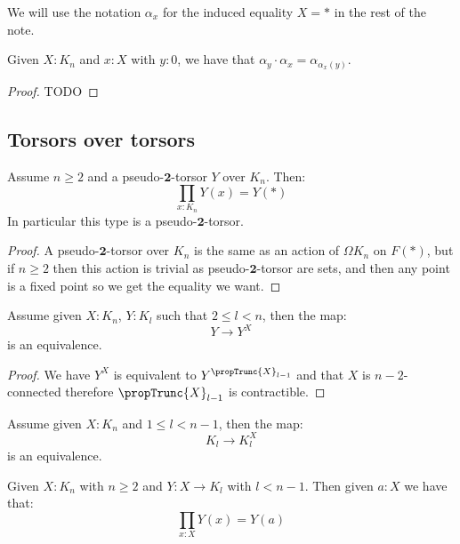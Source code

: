 We will use the notation $\alpha_x$ for the induced equality $X=*$ in the rest of the note.

\begin{lemma}\label{naturality-alpha}
Given $X:K_n$ and $x:X$ with $y:0$, we have that $\alpha_y\cdot\alpha_x = \alpha_{\alpha_x(y)}$.
\end{lemma}

\begin{proof}
TODO
\end{proof}



\subsection{Torsors over torsors}

\begin{lemma}\label{2-torsor-over-Kn}
Assume $n\geq 2$ and a pseudo-$\mathbf{2}$-torsor $Y$ over $K_n$. Then:
\[\prod_{x:K_n} Y(x) = Y(*)\]
In particular this type is a pseudo-$\mathbf{2}$-torsor.
\end{lemma}

\begin{proof}
A pseudo-$\mathbf{2}$-torsor over $K_n$ is the same as an action of $\Omega K_n$ on $F(*)$, but if $n\geq 2$ then this action is trivial as pseudo-$\mathbf{2}$-torsor are sets, and then any point is a fixed point so we get the equality we want.
\end{proof}

\begin{lemma}\label{torsor-map}
Assume given $X:K_n$, $Y:K_l$ such that $2\leq l<n$, then the map:
\[Y\to Y^X\]
is an equivalence.
\end{lemma}

\begin{proof}
We have $Y^X$ is equivalent to $Y^{\propTrunc{X}_{l-1}}$ and that $X$ is $n-2$-connected therefore $\propTrunc{X}_{l-1}$ is contractible.
\end{proof}

\begin{corollary}\label{dependent-torsor-gives-torsor}
Assume given $X:K_n$ and $1\leq l<n-1$, then the map:
\[K_l\to K_l^X\]
is an equivalence.
\end{corollary}

\begin{lemma}\label{integral-torsor-over-Kn}
Given $X:K_n$ with $n\geq 2$ and $Y:X\to K_l$ with $l<n-1$. Then given $a:X$ we have that:
\[\prod_{x:X} Y(x) = Y(a)\]
\end{lemma}

